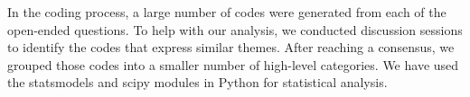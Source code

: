 In the coding process, a large number of codes were generated from each of the
open-ended questions. To help with our analysis, we conducted discussion
sessions to identify the codes that express similar themes. After reaching a
consensus, we grouped those codes into a smaller number of high-level
categories. We have used the statsmodels\cite{seabold2010} and
scipy\cite{scipy2020} modules in Python for statistical analysis. 

%

